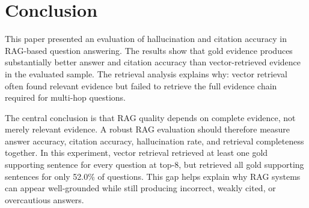 \documentclass[10pt,twocolumn]{article}
\begin{document}
\section{Conclusion}

This paper presented an evaluation of hallucination and citation accuracy in RAG-based question answering. The results show that gold evidence produces substantially better answer and citation accuracy than vector-retrieved evidence in the evaluated sample. The retrieval analysis explains why: vector retrieval often found relevant evidence but failed to retrieve the full evidence chain required for multi-hop questions.

The central conclusion is that RAG quality depends on complete evidence, not merely relevant evidence. A robust RAG evaluation should therefore measure answer accuracy, citation accuracy, hallucination rate, and retrieval completeness together. In this experiment, vector retrieval retrieved at least one gold supporting sentence for every question at top-8, but retrieved all gold supporting sentences for only 52.0\% of questions. This gap helps explain why RAG systems can appear well-grounded while still producing incorrect, weakly cited, or overcautious answers.
\end{document}
